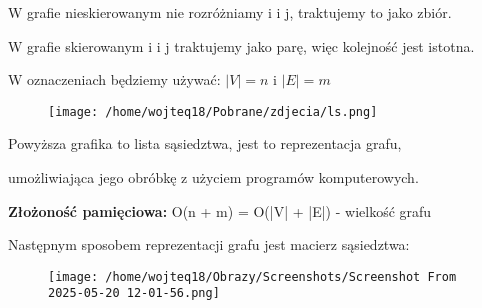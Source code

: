 \documentclass{article}
\begin{document}
W grafie nieskierowanym nie rozróżniamy i i j, traktujemy to jako zbiór. \par
W grafie skierowanym i i j traktujemy jako parę, więc kolejność jest istotna. \par
W oznaczeniach będziemy używać: $|V| = n \text{ i } |E| = m$ \par
\vspace{1\baselineskip}
     \begin{figure}[H]
        \centering
        \texttt{[image: /home/wojteq18/Pobrane/zdjecia/ls.png]}
        \label{fig:example_image}
    \end{figure} \par
\begin{center}
    Powyższa grafika to lista sąsiedztwa, jest to reprezentacja grafu, \par
    umożliwiająca jego obróbkę z użyciem programów komputerowych. \par
\end{center}
\vspace{1\baselineskip}
\textbf{Złożoność pamięciowa: } O(n  + m) = O(|V| + |E|) - wielkość grafu \par
\vspace{1\baselineskip}
\newpage
Następnym sposobem reprezentacji grafu jest macierz sąsiedztwa: \par
\begin{figure}[H]
    \centering
    \texttt{[image: /home/wojteq18/Obrazy/Screenshots/Screenshot From 2025-05-20 12-01-56.png]}
    \label{fig:example_image}
\end{figure} \par
\vspace{1\baselineskip}
\end{document}
